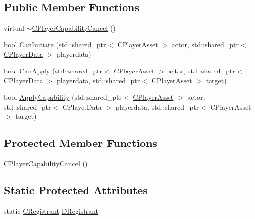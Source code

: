 \subsection*{Public Member Functions}
\begin{DoxyCompactItemize}
\item 
virtual \hyperlink{classCPlayerCapabilityCancel_a354db8bd423b9bf6959de288177db049}{$\sim$\+C\+Player\+Capability\+Cancel} ()
\item 
bool \hyperlink{classCPlayerCapabilityCancel_a8b4ad4a4983b01e458d439cf68fd2ba9}{Can\+Initiate} (std\+::shared\+\_\+ptr$<$ \hyperlink{classCPlayerAsset}{C\+Player\+Asset} $>$ actor, std\+::shared\+\_\+ptr$<$ \hyperlink{classCPlayerData}{C\+Player\+Data} $>$ playerdata)
\item 
bool \hyperlink{classCPlayerCapabilityCancel_a0221e4e768c998cb46f1dbc757647ec1}{Can\+Apply} (std\+::shared\+\_\+ptr$<$ \hyperlink{classCPlayerAsset}{C\+Player\+Asset} $>$ actor, std\+::shared\+\_\+ptr$<$ \hyperlink{classCPlayerData}{C\+Player\+Data} $>$ playerdata, std\+::shared\+\_\+ptr$<$ \hyperlink{classCPlayerAsset}{C\+Player\+Asset} $>$ target)
\item 
bool \hyperlink{classCPlayerCapabilityCancel_a8f738ac375bf5d1e7f8b768bce16b946}{Apply\+Capability} (std\+::shared\+\_\+ptr$<$ \hyperlink{classCPlayerAsset}{C\+Player\+Asset} $>$ actor, std\+::shared\+\_\+ptr$<$ \hyperlink{classCPlayerData}{C\+Player\+Data} $>$ playerdata, std\+::shared\+\_\+ptr$<$ \hyperlink{classCPlayerAsset}{C\+Player\+Asset} $>$ target)
\end{DoxyCompactItemize}
\subsection*{Protected Member Functions}
\begin{DoxyCompactItemize}
\item 
\hyperlink{classCPlayerCapabilityCancel_a7e3ac034b99b436032fdd2059d2fb727}{C\+Player\+Capability\+Cancel} ()
\end{DoxyCompactItemize}
\subsection*{Static Protected Attributes}
\begin{DoxyCompactItemize}
\item 
static \hyperlink{classCPlayerCapabilityCancel_1_1CRegistrant}{C\+Registrant} \hyperlink{classCPlayerCapabilityCancel_a239d2a965e7441fd81b79b8421707ff1}{D\+Registrant}
\end{DoxyCompactItemize}
